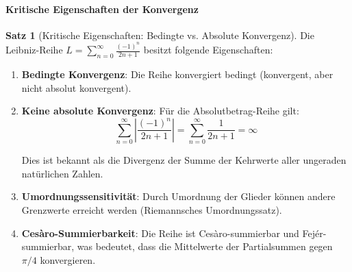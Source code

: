 \documentclass[a4paper, 12pt, twoside, openright]{report}
\theoremstyle{definition}
\theoremstyle{definition}
\newtheorem{satz}{Satz}[chapter]
\begin{document}
\paragraph{Kritische Eigenschaften der Konvergenz}

\begin{satz}[Kritische Eigenschaften: Bedingte vs. Absolute Konvergenz]
Die Leibniz-Reihe $L = \sum_{n=0}^{\infty} \frac{(-1)^n}{2n+1}$ besitzt folgende Eigenschaften:

\begin{enumerate}
\item \textbf{Bedingte Konvergenz}: Die Reihe konvergiert bedingt (konvergent, aber nicht absolut konvergent).

\item \textbf{Keine absolute Konvergenz}: Für die Absolutbetrag-Reihe gilt:
\begin{equation}
\sum_{n=0}^{\infty} \left|\frac{(-1)^n}{2n+1}\right| = \sum_{n=0}^{\infty} \frac{1}{2n+1} = \infty
\end{equation}

Dies ist bekannt als die Divergenz der Summe der Kehrwerte aller ungeraden natürlichen Zahlen.

\item \textbf{Umordnungssensitivität}: Durch Umordnung der Glieder können andere Grenzwerte erreicht werden (Riemannsches Umordnungssatz).

\item \textbf{Cesàro-Summierbarkeit}: Die Reihe ist Cesàro-summierbar und Fejér-summierbar, was bedeutet, dass die Mittelwerte der Partialsummen gegen $\pi/4$ konvergieren.
\end{enumerate}
\end{satz}
\end{document}

